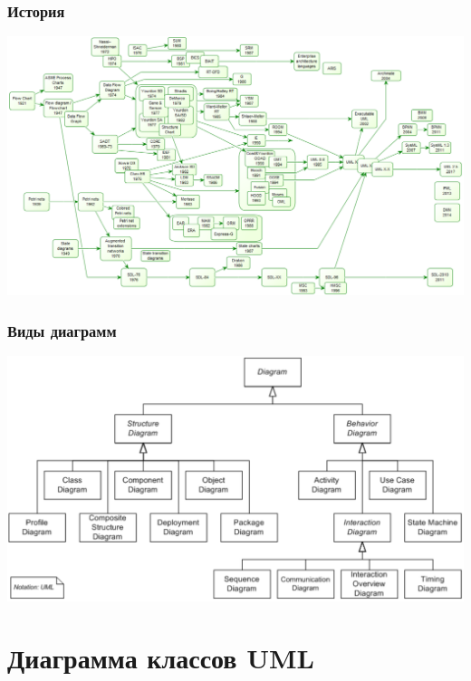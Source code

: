 \documentclass[xetex,mathserif,serif]{beamer}
\begin{document}
	\begin{frame}
		\frametitle{История}
		\begin{center}
			\includegraphics[width=\textwidth]{umlHistory.png}
		\end{center}
	\end{frame}

	\begin{frame}
		\frametitle{Виды диаграмм}
		\begin{center}
			\includegraphics[width=\textwidth]{umlDiagrams.png}
		\end{center}
	\end{frame}

	\section{Диаграмма классов UML}
\end{document}
